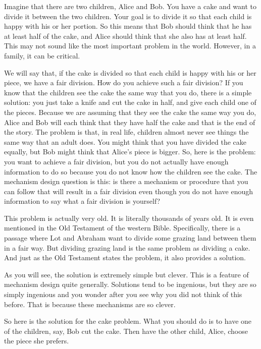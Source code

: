 \documentclass[12pt,a4paper]{article}
\newenvironment{original}{%
  \par\vspace{4pt}\noindent%
  \color{black}%
  \ignorespaces
}{%
  \par\vspace{2pt}%
}
\begin{document}
\begin{original}
Imagine that there are two children, Alice and Bob. You have a cake and want to divide it between the two children. Your goal is to divide it so that each child is happy with his or her portion. So this means that Bob should think that he has at least half of the cake, and Alice should think that she also has at least half. This may not sound like the most important problem in the world. However, in a family, it can be critical.

We will say that, if the cake is divided so that each child is happy with his or her piece, we have a fair division. How do you achieve such a fair division? If you know that the children see the cake the same way that you do, there is a simple solution: you just take a knife and cut the cake in half, and give each child one of the pieces. Because we are assuming that they see the cake the same way you do, Alice and Bob will each think that they have half the cake and that is the end of the story. The problem is that, in real life, children almost never see things the same way that an adult does. You might think that you have divided the cake equally, but Bob might think that Alice's piece is bigger. So, here is the problem: you want to achieve a fair division, but you do not actually have enough information to do so because you do not know how the children see the cake. The mechanism design question is this: is there a mechanism or procedure that you can follow that will result in a fair division even though you do not have enough information to say what a fair division is yourself?

This problem is actually very old. It is literally thousands of years old. It is even mentioned in the Old Testament of the western Bible. Specifically, there is a passage where Lot and Abraham want to divide some grazing land between them in a fair way. But dividing grazing land is the same problem as dividing a cake. And just as the Old Testament states the problem, it also provides a solution.

As you will see, the solution is extremely simple but clever. This is a feature of mechanism design quite generally. Solutions tend to be ingenious, but they are so simply ingenious and you wonder after you see why you did not think of this before. That is because these mechanisms are so clever.

So here is the solution for the cake problem. What you should do is to have one of the children, say, Bob cut the cake. Then have the other child, Alice, choose the piece she prefers.


\end{original}
\end{document}
